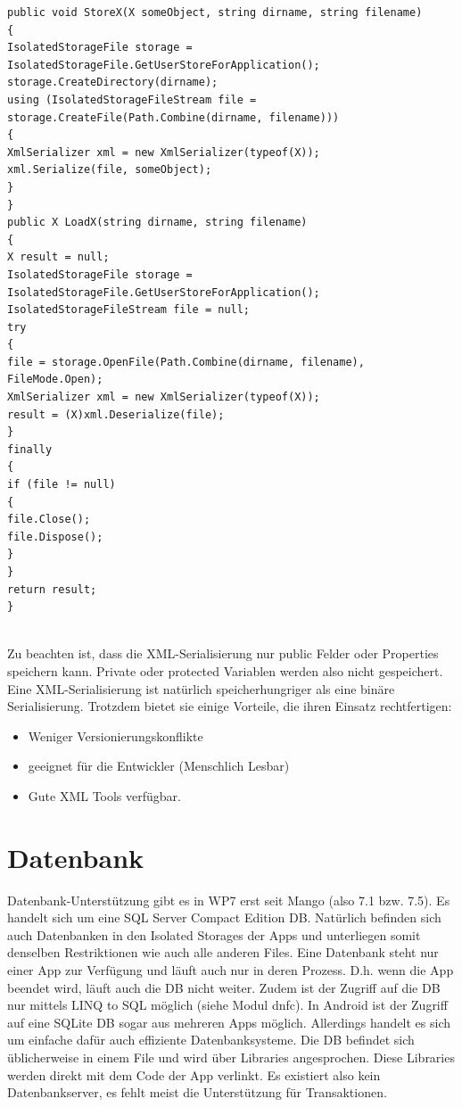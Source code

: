 \documentclass[a4paper,10pt]{scrreprt}
\begin{document}
\begin{lstlisting}[caption=File Storage]
 public void StoreX(X someObject, string dirname, string filename)
{
IsolatedStorageFile storage = IsolatedStorageFile.GetUserStoreForApplication();
storage.CreateDirectory(dirname);
using (IsolatedStorageFileStream file = storage.CreateFile(Path.Combine(dirname, filename)))
{
XmlSerializer xml = new XmlSerializer(typeof(X));
xml.Serialize(file, someObject);
}
}
public X LoadX(string dirname, string filename)
{
X result = null;
IsolatedStorageFile storage = IsolatedStorageFile.GetUserStoreForApplication();
IsolatedStorageFileStream file = null;
try
{
file = storage.OpenFile(Path.Combine(dirname, filename), FileMode.Open);
XmlSerializer xml = new XmlSerializer(typeof(X));
result = (X)xml.Deserialize(file);
}
finally
{
if (file != null)
{
file.Close();
file.Dispose();
}
}
return result;
}


\end{lstlisting}
Zu beachten ist, dass die XML-Serialisierung nur public Felder oder Properties speichern kann. Private oder
protected Variablen werden also nicht gespeichert.
Eine XML-Serialisierung ist natürlich speicherhungriger als eine binäre Serialisierung. Trotzdem bietet sie einige
Vorteile, die ihren Einsatz rechtfertigen:
\begin{itemize}
 \item Weniger Versionierungskonflikte
 \item geeignet für die Entwickler (Menschlich Lesbar)
 \item Gute XML Tools verfügbar.
\end{itemize}

\section{Datenbank}
Datenbank-Unterstützung gibt es in WP7 erst seit Mango (also 7.1 bzw. 7.5). Es handelt sich um eine SQL Server
Compact Edition DB. Natürlich befinden sich auch Datenbanken in den Isolated Storages der Apps und
unterliegen somit denselben Restriktionen wie auch alle anderen Files. Eine Datenbank steht nur einer App zur
Verfügung und läuft auch nur in deren Prozess. D.h. wenn die App beendet wird, läuft auch die DB nicht weiter.
Zudem ist der Zugriff auf die DB nur mittels LINQ to SQL möglich (siehe Modul dnfc).
In Android ist der Zugriff auf eine SQLite DB sogar aus mehreren Apps möglich. Allerdings handelt es sich um
einfache dafür auch effiziente Datenbanksysteme. Die DB befindet sich üblicherweise in einem File und wird
über Libraries angesprochen. Diese Libraries werden direkt mit dem Code der App verlinkt. Es existiert also kein
Datenbankserver, es fehlt meist die Unterstützung für Transaktionen.
\end{document}
